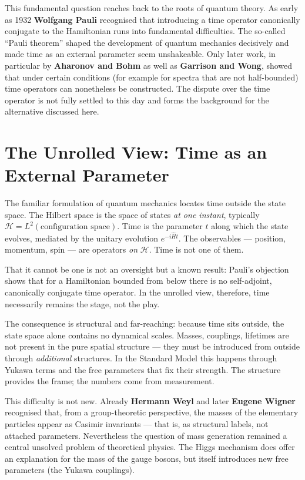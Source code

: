 This fundamental question reaches back to the roots of quantum theory. As early as 1932 \textbf{Wolfgang Pauli} recognised that introducing a time operator canonically conjugate to the Hamiltonian runs into fundamental difficulties. The so-called ``Pauli theorem'' shaped the development of quantum mechanics decisively and made time as an external parameter seem unshakeable. Only later work, in particular by \textbf{Aharonov and Bohm} as well as \textbf{Garrison and Wong}, showed that under certain conditions (for example for spectra that are not half-bounded) time operators can nonetheless be constructed. The dispute over the time operator is not fully settled to this day and forms the background for the alternative discussed here.

\section{The Unrolled View: Time as an External Parameter}

The familiar formulation of quantum mechanics locates time outside the state space. The Hilbert space is the space of states \emph{at one instant}, typically $\mathcal{H} = L^2(\text{configuration space})$. Time is the parameter $t$ along which the state evolves, mediated by the unitary evolution $e^{-i\hat{H}t}$. The observables --- position, momentum, spin --- are operators \emph{on} $\mathcal{H}$. Time is not one of them.

That it cannot be one is not an oversight but a known result: Pauli's objection shows that for a Hamiltonian bounded from below there is no self-adjoint, canonically conjugate time operator. In the unrolled view, therefore, time necessarily remains the stage, not the play.

The consequence is structural and far-reaching: because time sits outside, the state space alone contains no dynamical scales. Masses, couplings, lifetimes are not present in the pure spatial structure --- they must be introduced from outside through \emph{additional} structures. In the Standard Model this happens through Yukawa terms and the free parameters that fix their strength. The structure provides the frame; the numbers come from measurement.

This difficulty is not new. Already \textbf{Hermann Weyl} and later \textbf{Eugene Wigner} recognised that, from a group-theoretic perspective, the masses of the elementary particles appear as Casimir invariants --- that is, as structural labels, not attached parameters. Nevertheless the question of mass generation remained a central unsolved problem of theoretical physics. The Higgs mechanism does offer an explanation for the mass of the gauge bosons, but itself introduces new free parameters (the Yukawa couplings).


